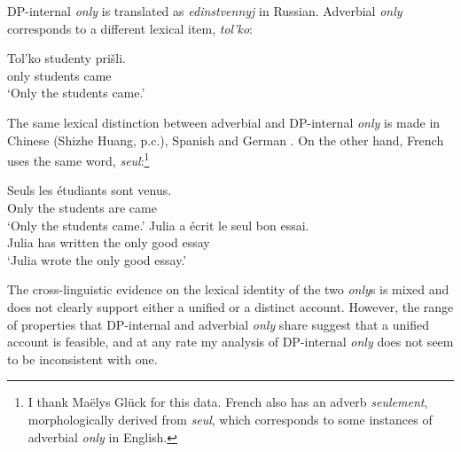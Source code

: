 DP-internal \textit{only} is translated as \textit{edinstvennyj} in Russian. Adverbial \textit{only} corresponds to a different lexical item, \textit{tol'ko}:

\begin{exe}
	\ex \gll Tol'ko studenty pri\v{s}li.\\
	only students came\\
	\glt `Only the students came.'
\end{exe}

The same lexical distinction between adverbial and DP-internal \textit{only} is made in Chinese (Shizhe Huang, p.c.), Spanish and German \citep{mcnally08}. On the other hand, French uses the same word, \textit{seul}:\footnote{I thank Ma\"{e}lys Gl\"{u}ck for this data. French also has an adverb \textit{seulement}, morphologically derived from \textit{seul}, which corresponds to some instances of adverbial \textit{only} in English.}

\begin{exe}
	\ex \gll Seuls les \'{e}tudiants sont venus.\\
	Only the students are came\\
	\glt `Only the students came.'
	\ex \gll Julia a \'{e}crit le seul bon essai.\\
	Julia has written the only good essay\\
	\glt `Julia wrote the only good essay.'
\end{exe}

The cross-linguistic evidence on the lexical identity of the two \textit{only}s is mixed and does not clearly support either a unified or a distinct account. However, the range of properties that DP-internal and adverbial \textit{only} share suggest that a unified account is feasible, and at any rate my analysis of DP-internal \textit{only} does not seem to be inconsistent with one.